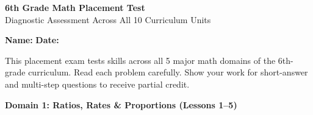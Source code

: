 \documentclass[12pt, letterpaper, fleqn]{article}
\begin{document}
\begin{center}
    {\LARGE \textbf{6th Grade Math Placement Test}}\\[4pt]
    {\large Diagnostic Assessment Across All 10 Curriculum Units}
\end{center}

\vspace{4mm}
\textbf{Name:} \underline{\hspace{6cm}}
\hfill
\textbf{Date:} \underline{\hspace{4cm}}\\
\vspace{2mm}

\begin{tcolorbox}[colback=black!5, colframe=black!40, arc=2mm, title=\textbf{Instructions for Students}]
This placement exam tests skills across all 5 major math domains of the 6th-grade curriculum. Read each problem carefully. Show your work for short-answer and multi-step questions to receive partial credit.
\end{tcolorbox}

\vspace{4mm}

\begin{tcolorbox}[colback=white, colframe=black, arc=2mm]
    \textbf{Domain 1: Ratios, Rates \& Proportions (Lessons 1--5)}
\end{tcolorbox}
\end{document}
